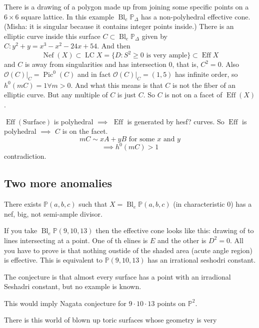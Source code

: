 \begin{enumerate}[label=\textbf{Step \arabic*}]
\begin{remark}
				There is a drawing of a polygon made up from joining some specific points on a $6\times 6$ square lattice. In this example $\operatorname{Bl}_e \mathbb{P}_\Delta$ has a non-polyhedral effective cone. (Misha: it is singular because it contains integer points inside.) There is an elliptic curve inside this surface $C\subset \operatorname{Bl}_e\mathbb{P}_\Delta$ given by $C:y^2+y=x^3-x^2-24x+54$. And then
				\[\operatorname{Nef}(X)\subset \operatorname{LC}X= \{D:S^2\geq 0\text{ is very ample} \}\subset \operatorname{Ef f}X\]
and $C$ is away from singularities and has intersection 0, that is, $C^2=0$. Also $\mathcal{O}(C)|_{C}=\operatorname{Pic}^0(C)$ and in fact $\mathcal{O}(C)|_{C}=(1,5)$ has infinite order, so $h^0(mC)=1\forall m>0$. And what this means is that $C$ is not the fiber of an elliptic curve. But any multiple of $C$ is just $C$. So $C$ is not on a facet of $\operatorname{E f f}(X)$.
\begin{thm}[Nikulin]\leavevmode
	$\operatorname{Ef f}(\text{Surface} )$ is polyhedral $\implies $ $\operatorname{Ef f}$ is generated by hesf? curves. So $\operatorname{E f f}$ is polyhedral $\implies $ $C$ is on the facet.
	\[mC\sim xA+yB\text{ for some $x$ and $y$} \]
	\[\implies h^0(mC)>1\]
	contradiction.
\end{thm}
			\end{remark}
\end{enumerate}

\subsection{Two more anomalies}

\begin{thm}\leavevmode
	There exists $\mathbb{P}(a,b,c)$ such that $X=\operatorname{Bl}_e\mathbb{P}(a,b,c)$ (in characteristic 0) has a nef, big, not semi-ample divisor.
\end{thm}

\begin{conjecture}
	If you take $\operatorname{Bl}_e\mathbb{P}(9,10,13)$ then the effective cone looks like this: drawing of to lines intersecting at a point. One of th elines is $E$ and the other is $D^2=0$. All you have to prove is that nothing oustide of the shaded area (acute angle region) is effective. This is equivalent to $\mathbb{P}(9,10,13)$ has an irrational seshodri constant.

	The conjecture is that almost every surface has a point with an irradional Seshadri constant, but no example is known.
\end{conjecture}

This would imply Nagata conjecture for $ 9\cdot 10\cdot 13$ points on $\mathbb{P}^2$.

There is this world of blown up toric surfaces whose geometry is very 



